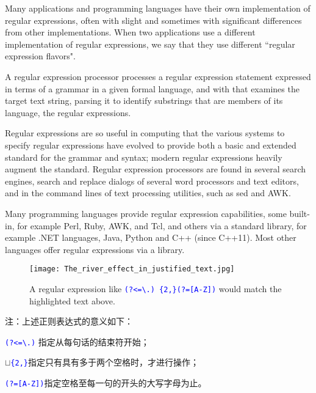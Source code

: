Many applications and programming languages have their own implementation of regular expressions, often with slight and sometimes with significant differences from other implementations. When two applications use a different implementation of regular expressions, we say that they use different ``regular expression flavors".


A regular expression processor processes a regular expression statement expressed in terms of a grammar in a given formal language, and with that examines the target text string, parsing it to identify substrings that are members of its language, the regular expressions.

Regular expressions are so useful in computing that the various systems to specify regular expressions have evolved to provide both a basic and extended standard for the grammar and syntax; modern regular expressions heavily augment the standard. Regular expression processors are found in several search engines, search and replace dialogs of several word processors and text editors, and in the command lines of text processing utilities, such as sed and AWK.

Many programming languages provide regular expression capabilities, some built-in, for example Perl, Ruby, AWK, and Tcl, and others via a standard library, for example .NET languages, Java, Python and C++ (since C++11). Most other languages offer regular expressions via a library.


\begin{figure}[!ht]
\centering
\texttt{[image: The\_river\_effect\_in\_justified\_text.jpg]}
\vspace{-20pt}
\caption{\small{A regular expression like \textcolor{Blue}{\texttt{(?<=\textbackslash.) \{2,\}(?=[A-Z])}} would match the highlighted text above.}}
\label{regexp_example}
\end{figure}

注：上述正则表达式的意义如下：

\begin{compactenum}
\item \textcolor{Blue}{\texttt{(?<=\textbackslash.)}} 指定从每句话的结束符开始；
\item $\sqcup$\textcolor{Blue}{\texttt{\{2,\}}}指定只有具有多于两个空格时，才进行操作；
\item \textcolor{Blue}{\texttt{(?=[A-Z])}}指定空格至每一句的开头的大写字母为止。
\end{compactenum}



